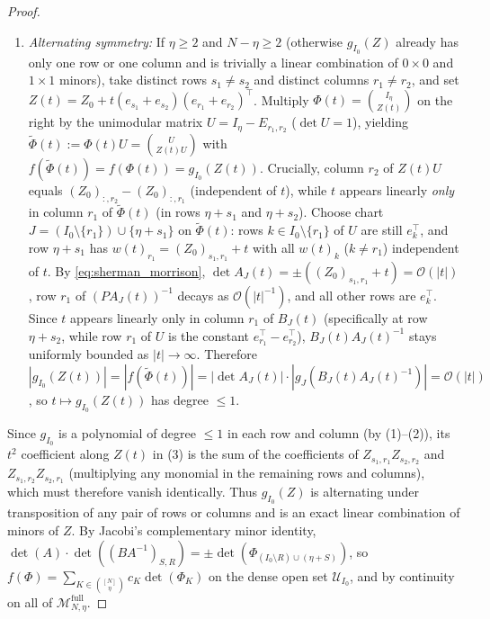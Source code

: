 \documentclass[11pt,a4paper]{article}
\theoremstyle{definition}
\begin{document}
\begin{proof}
\begin{enumerate}[leftmargin=1.5em]
  \item \emph{Alternating symmetry:} If $\eta \ge 2$ and $N - \eta \ge 2$ (otherwise $g_{I_0}(Z)$ already has only one row or one column and is trivially a linear combination of $0\times 0$ and $1\times 1$ minors), take distinct rows $s_1 \neq s_2$ and distinct columns $r_1 \neq r_2$, and set $Z(t) = Z_0 + t(e_{s_1} + e_{s_2})(e_{r_1} + e_{r_2})^\top$. Multiply $\Phi(t) = \binom{I_\eta}{Z(t)}$ on the right by the unimodular matrix $U = I_\eta - E_{r_1, r_2}$ ($\det U = 1$), yielding $\widetilde{\Phi}(t) := \Phi(t) U = \binom{U}{Z(t) U}$ with $f(\widetilde{\Phi}(t)) = f(\Phi(t)) = g_{I_0}(Z(t))$. Crucially, column $r_2$ of $Z(t) U$ equals $(Z_0)_{:, r_2} - (Z_0)_{:, r_1}$ (independent of $t$), while $t$ appears linearly \emph{only} in column $r_1$ of $\widetilde{\Phi}(t)$ (in rows $\eta + s_1$ and $\eta + s_2$). Choose chart $J = (I_0 \setminus \{r_1\}) \cup \{\eta + s_1\}$ on $\widetilde{\Phi}(t)$: rows $k \in I_0 \setminus \{r_1\}$ of $U$ are still $e_k^\top$, and row $\eta + s_1$ has $w(t)_{r_1} = (Z_0)_{s_1, r_1} + t$ with all $w(t)_k$ ($k \neq r_1$) independent of $t$. By \eqref{eq:sherman_morrison}, $\det A_J(t) = \pm((Z_0)_{s_1, r_1} + t) = \mathcal{O}(|t|)$, row $r_1$ of $(P A_J(t))^{-1}$ decays as $\mathcal{O}(|t|^{-1})$, and all other rows are $e_k^\top$. Since $t$ appears linearly only in column $r_1$ of $B_J(t)$ (specifically at row $\eta + s_2$, while row $r_1$ of $U$ is the constant $e_{r_1}^\top - e_{r_2}^\top$), $B_J(t) A_J(t)^{-1}$ stays uniformly bounded as $|t| \to \infty$. Therefore $|g_{I_0}(Z(t))| = |f(\widetilde{\Phi}(t))| = |\det A_J(t)| \cdot |g_J(B_J(t) A_J(t)^{-1})| = \mathcal{O}(|t|)$, so $t \mapsto g_{I_0}(Z(t))$ has degree $\le 1$.
\end{enumerate}
Since $g_{I_0}$ is a polynomial of degree $\le 1$ in each row and column (by (1)--(2)), its $t^2$ coefficient along $Z(t)$ in (3) is the sum of the coefficients of $Z_{s_1, r_1} Z_{s_2, r_2}$ and $Z_{s_1, r_2} Z_{s_2, r_1}$ (multiplying any monomial in the remaining rows and columns), which must therefore vanish identically. Thus $g_{I_0}(Z)$ is alternating under transposition of any pair of rows or columns and is an exact linear combination of minors of $Z$. By Jacobi's complementary minor identity, $\det(A) \cdot \det((B A^{-1})_{S,R}) = \pm \det(\Phi_{(I_0\setminus R)\cup(\eta+S)})$, so $f(\Phi) = \sum_{K \in \binom{[N]}{\eta}} c_K \det(\Phi_K)$ on the dense open set $\mathcal{U}_{I_0}$, and by continuity on all of $\mathcal{M}_{N,\eta}^{\mathrm{full}}$.
\end{proof}
\end{document}
